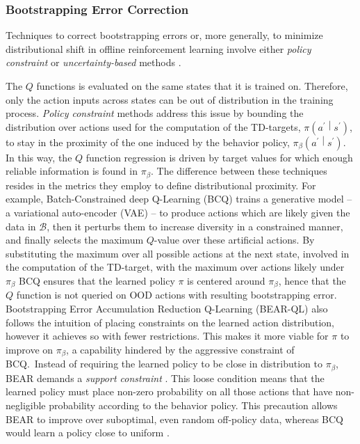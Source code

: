 \subsubsection{Bootstrapping Error
Correction}\label{sec:intro_related_work}
Techniques to correct bootstrapping errors or, more generally, to
minimize distributional shift in offline reinforcement learning
involve either \textit{policy constraint} or
\textit{uncertainty-based} methods \citep{levine2020offline}.

The $Q$ functions is evaluated on the same states that it is
trained on. Therefore, only the action inputs across states can be out
of distribution in the training process. \textit{Policy constraint}
methods address this issue by bounding the distribution over actions
used for the computation of the TD-targets,
$\pi\left(a^\prime\middle|s^\prime\right)$, to stay in the proximity
of the one induced by the behavior policy,
$\pi_\beta\left(a^\prime\middle|s^\prime\right)$. In this way, the $Q$
function regression is driven by target values for which enough
reliable information is found in $\pi_\beta$.
The difference
between these techniques resides in the metrics they employ to define
distributional proximity.
For example, Batch-Constrained deep Q-Learning (BCQ)
\citep{pmlr-v97-fujimoto19a} trains a generative model -- a variational
auto-encoder (VAE) \citep{kingma2013auto} -- to produce actions which
are likely given the data in $\mathcal{B}$, then it perturbs them to
increase diversity in a constrained manner, and finally selects the
maximum $Q$-value over these artificial actions. By substituting the
maximum over all possible actions at the next state, involved in the
computation of the TD-target, with the maximum over actions likely
under $\pi_\beta$ BCQ ensures that the learned policy $\pi$ is
centered around $\pi_\beta$, hence that the $Q$ function is not
queried on OOD actions with resulting bootstrapping
error. Bootstrapping Error Accumulation Reduction Q-Learning (BEAR-QL)
\citep{kumar2019stabilizing} also follows the intuition of placing
constraints on the learned action distribution, however it achieves so
with fewer restrictions. This makes it more viable for $\pi$ to
improve on $\pi_\beta$, a capability hindered by the aggressive
constraint of BCQ.\ Instead of requiring the learned policy to be
close in distribution to $\pi_\beta$, BEAR demands a \textit{support
constraint} \citep{kumar}. This loose condition means that the
learned policy must place non-zero probability on all those actions
that have non-negligible probability according to the behavior policy.
This precaution allows BEAR to improve over suboptimal, even random
off-policy data, whereas BCQ would learn a policy close to uniform
\citep{kumar2019stabilizing}.
